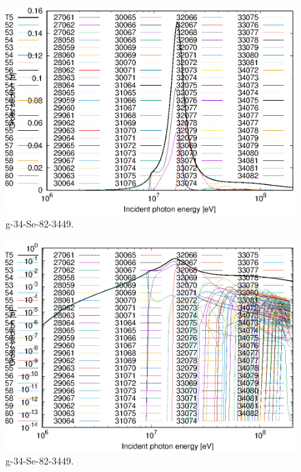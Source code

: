 \begin{figure}
 \includegraphics[width=\linewidth]{eps/g_34-Se-82_3449.eps}
  \caption{g-34-Se-82-3449.}
\end{figure}
\begin{figure}
 \includegraphics[width=\linewidth]{eps-log/g_34-Se-82_3449.eps}
 \caption{g-34-Se-82-3449.}
\end{figure}
\newpage \clearpage

